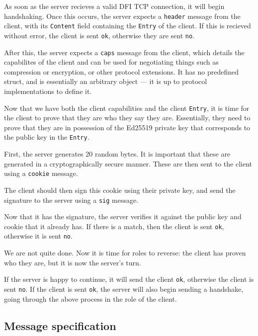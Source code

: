	\begin{multicols}{2}
		As soon as the server recieves a valid DFI TCP connection, it will begin
		handshaking.
		Once this occurs, the server expects a \texttt{header} message from the
		client, with its \texttt{Content} field containing the \texttt{Entry} of the client. If
		this is recieved without error, the client is sent \texttt{ok},
		otherwise they are sent \texttt{no}.

		After this, the server expects a \texttt{caps} message from the client,
		which details the capabilites of the client and can be used for
		negotiating things such as compression or encryption, or other protocol
		extensions. It has no predefined struct, and is essentially
		an arbitrary object --- it is up to protocol implementations to define it.

		Now that we have both the client capabilities and the client \texttt{Entry}, it is
		time for the client to prove that they are who they say they are.
		Essentially, they need to prove that they are in possession of the
		Ed25519 private key that corresponds to the public key in the \texttt{Entry}.

		First, the server generates 20 random bytes. It is important that these
		are generated in a cryptographically secure manner. These are
		then sent to the client using a \texttt{cookie} message.

		The client should then sign this cookie using their private key, and
		send the signature to the server using a \texttt{sig} message.

		Now that it has the signature, the server verifies it against the public
		key and cookie that it already has. If there is a match, then the client
		is sent \texttt{ok}, otherwise it is sent \texttt{no}.

		We are not quite done. Now it is time for roles to reverse: the
		client has proven who they are, but it is now the server's turn.

		If the server is happy to continue, it will send the client \texttt{ok},
		otherwise the client is sent \texttt{no}. If the client is sent
		\texttt{ok}, the server will also begin sending a handshake, going
		through the above process in the role of the client.
	\end{multicols}

	\subsection{Message specification}
